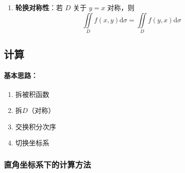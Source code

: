 \documentclass[../book.tex]{subfiles}
\begin{document}
\begin{enumerate}
\begin{itemize}
        \end{itemize}

        \item \textbf{轮换对称性}：若 $D$ 关于 $y = x$ 对称，则
        \[
            \iint\limits_D f(x,y) \mathrm{d}\sigma = \iint\limits_D f(y,x) \mathrm{d}\sigma
        \]


    \end{enumerate}

    \subsection{计算}

    \paragraph{基本思路：}
    \begin{enumerate}
        \item 拆被积函数
        \item 拆$D$（对称）
        \item 交换积分次序
        \item 切换坐标系
    \end{enumerate}

    \subsubsection{直角坐标系下的计算方法}
\end{document}
